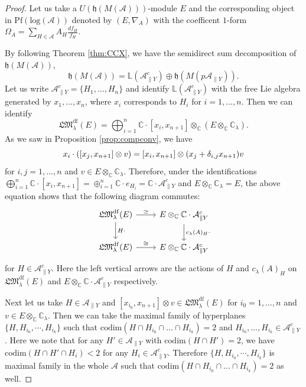 \documentclass[a4paper,12pt]{article}
\theoremstyle{definition}
\theoremstyle{remark}
\begin{document}
\begin{proof}
Let us take a $U(\mathfrak{h}(M(\mathcal{A})))$-module $E$ and 
the corresponding object in $\mathrm{Pf}(\mathrm{log}(\mathcal{A}))$ denoted by $(E, \nabla_A)$
with the coefficent $1$-form
$\Omega_{A}=\sum_{H\in \mathcal{A}}A_{H}\frac{d f_{H}}{f_{H}}$.

By following Theorem \ref{thm:CCX}, we have the semidirect sum decomposition of $\mathfrak{h}(M(\mathcal{A}))$,
\[
	\mathfrak{h}(M(\mathcal{A}))=
	\mathbb{L}(\mathcal{A}_{\parallel Y}^{c})\oplus \mathfrak{h}(M(p\mathcal{A}_{\parallel Y})).
\]
Let us write $\mathcal{A}_{\parallel Y}^{c}=\{H_{1},\ldots,H_{n}\}$
and identify $\mathbb{L}(\mathcal{A}_{\parallel Y}^{c})$ with the free Lie algebra generated by $x_{1},\ldots,x_{n}$, where $x_{i}$ corresponds to $H_{i}$ for $i=1,\ldots,n$.
Then we can identify
\[
	\mathfrak{LM}^{\mathrm{df}}_{\lambda}(E)=\bigoplus_{i=1}^{n}\mathbb{C}\cdot [x_{i},x_{n+1}]\otimes_{\mathbb{C}}(E\otimes_{\mathbb{C}}\mathbb{C}_{\lambda}).
\]
As we saw in Proposition \ref{prop:compconv}, we have 
\[
	x_{i}\cdot ([x_{j},x_{n+1}]\otimes v)=[x_{i},x_{n+1}]\otimes (x_{j}+\delta_{i,j}x_{n+1})v\\
\]
for $i,j=1,\ldots,n$ and $v\in E\otimes_{\mathbb{C}}\mathbb{C}_{\lambda}$.
Therefore, under the identifications
$\bigoplus_{i=1}^{n}\mathbb{C}\cdot [x_{i},x_{n+1}]=\oplus_{i=1}^{n}\mathbb{C}\cdot e_{H_{i}}=\mathbb{C}\cdot \mathcal{A}_{\parallel Y}^{c}$
and $E\otimes_{\mathbb{C}}\mathbb{C}_{\lambda}=E$,
the above equation shows that the following diagram commutes:
\[
	\begin{tikzcd}
	\mathfrak{LM}^{\mathrm{df}}_{\lambda}(E)\arrow[r,"\simeq"]\arrow[d,"H\cdot"]&
	E\otimes_{\mathbb{C}}\mathbb{C}\cdot \mathcal{A}_{\parallel Y}^{c}\arrow[d,"c_{\lambda}(A)_{H}\cdot"]\\
	\mathfrak{LM}^{\mathrm{df}}_{\lambda}(E)\arrow[r,"\cong"]&
	E\otimes_{\mathbb{C}}\mathbb{C}\cdot \mathcal{A}_{\parallel Y}^{c}
	\end{tikzcd}
\]
for $H\in \mathcal{A}_{\parallel Y}^{c}$.
Here the left vertical arrows are the actions of $H$ and $c_{\lambda}(A)_{H}$ 
on $\mathfrak{LM}^{\mathrm{df}}_{\lambda}(E)$ and 
 $E\otimes_{\mathbb{C}}\mathbb{C}\cdot \mathcal{A}_{\parallel Y}^{c}$ respectively.


Next let us take $H\in \mathcal{A}_{\parallel Y}$ and 
$[x_{i_{0}},x_{n+1}]\otimes v\in \mathfrak{LM}^{\mathrm{df}}_{\lambda}(E)$
for $i_{0}=1,\ldots,n$ and $v\in E\otimes_{\mathbb{C}}\mathbb{C}_{\lambda}$.
Then we can take the maximal family of hyperplanes $\{H,H_{i_{0}},\cdots, H_{i_{k}}\}$ such that 
$\mathrm{codim}(H\cap H_{i_{0}}\cap\ldots \cap H_{i_{k}})=2$
and $H_{i_{0}},\ldots,H_{i_{k}}\in \mathcal{A}_{\parallel Y}^{c}$.
Here we note that for any $H'\in \mathcal{A}_{\parallel Y}$
with $\mathrm{codim}(H\cap H')=2$,
we have 
 $\mathrm{codim}(H\cap H'\cap H_{i})<2$
for any $H_{i}\in \mathcal{A}_{\parallel Y}^{c}$.
Therefore $\{H,H_{i_{0}},\cdots, H_{i_{k}}\}$
is maximal family in the whole $\mathcal{A}$
such that $\mathrm{codim}(H\cap H_{i_{0}}\cap\ldots \cap H_{i_{k}})=2$ as well.


\end{proof}
\end{document}
